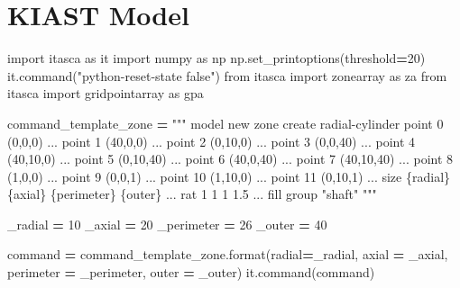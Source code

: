 \documentclass[a4paper, nobind]{templates/ociamthesis}
\newenvironment{Shaded}{\begin{snugshade}}{\end{snugshade}}
\newcommand{\BuiltInTok}[1]{#1}
\newcommand{\DecValTok}[1]{\textcolor[rgb]{0.00,0.00,0.81}{#1}}
\newcommand{\ImportTok}[1]{#1}
\newcommand{\NormalTok}[1]{#1}
\newcommand{\OperatorTok}[1]{\textcolor[rgb]{0.81,0.36,0.00}{\textbf{#1}}}
\newcommand{\SpecialCharTok}[1]{\textcolor[rgb]{0.00,0.00,0.00}{#1}}
\newcommand{\StringTok}[1]{\textcolor[rgb]{0.31,0.60,0.02}{#1}}
\renewenvironment{Shaded}
{
  \vspace{10pt}%
  \begin{snugshade}%
}{%
  \end{snugshade}%
  \vspace{8pt}%
}
\begin{document}
\hypertarget{kiast-model}{%
\section{KIAST Model}\label{kiast-model}}

\begin{Shaded}
\begin{Highlighting}[]
\ImportTok{import}\NormalTok{ itasca }\ImportTok{as}\NormalTok{ it}
\ImportTok{import}\NormalTok{ numpy }\ImportTok{as}\NormalTok{ np}
\NormalTok{np.set\_printoptions(threshold}\OperatorTok{=}\DecValTok{20}\NormalTok{)}
\NormalTok{it.command(}\StringTok{"python{-}reset{-}state false"}\NormalTok{)}
\ImportTok{from}\NormalTok{ itasca }\ImportTok{import}\NormalTok{ zonearray }\ImportTok{as}\NormalTok{ za}
\ImportTok{from}\NormalTok{ itasca }\ImportTok{import}\NormalTok{ gridpointarray }\ImportTok{as}\NormalTok{ gpa}

\NormalTok{command\_template\_zone }\OperatorTok{=} \StringTok{"""}
\StringTok{model new}
\StringTok{zone create radial{-}cylinder point 0 (0,0,0) ...}
\StringTok{                            point 1 (40,0,0) ...}
\StringTok{                            point 2 (0,10,0) ...}
\StringTok{                            point 3 (0,0,40) ...}
\StringTok{                            point 4 (40,10,0) ...}
\StringTok{                            point 5 (0,10,40) ...}
\StringTok{                            point 6 (40,0,40) ...}
\StringTok{                            point 7 (40,10,40) ...}
\StringTok{                            point 8 (1,0,0) ...}
\StringTok{                            point 9 (0,0,1) ...}
\StringTok{                            point 10 (1,10,0) ...}
\StringTok{                            point 11 (0,10,1) ...}
\StringTok{                            size }\SpecialCharTok{\{radial\}}\StringTok{ }\SpecialCharTok{\{axial\}}\StringTok{ }\SpecialCharTok{\{perimeter\}}\StringTok{ }\SpecialCharTok{\{outer\}}\StringTok{ ...}
\StringTok{                            rat 1 1 1 1.5 ...}
\StringTok{                            fill group "shaft"}
\StringTok{"""}

\NormalTok{\_radial }\OperatorTok{=} \DecValTok{10}
\NormalTok{\_axial }\OperatorTok{=} \DecValTok{20}
\NormalTok{\_perimeter }\OperatorTok{=} \DecValTok{26} 
\NormalTok{\_outer }\OperatorTok{=} \DecValTok{40}

\NormalTok{command }\OperatorTok{=}\NormalTok{ command\_template\_zone.}\BuiltInTok{format}\NormalTok{(radial}\OperatorTok{=}\NormalTok{\_radial, axial }\OperatorTok{=}\NormalTok{ \_axial, perimeter }\OperatorTok{=}\NormalTok{ \_perimeter, outer }\OperatorTok{=}\NormalTok{ \_outer)}
\NormalTok{it.command(command)}



\end{Highlighting}
\end{Shaded}
\end{document}
